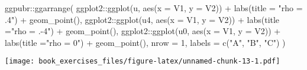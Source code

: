 \documentclass[
]{article}
\newenvironment{Shaded}{\begin{snugshade}}{\end{snugshade}}
\newcommand{\AttributeTok}[1]{\textcolor[rgb]{0.77,0.63,0.00}{#1}}
\newcommand{\DecValTok}[1]{\textcolor[rgb]{0.00,0.00,0.81}{#1}}
\newcommand{\FunctionTok}[1]{\textcolor[rgb]{0.00,0.00,0.00}{#1}}
\newcommand{\NormalTok}[1]{#1}
\newcommand{\SpecialCharTok}[1]{\textcolor[rgb]{0.00,0.00,0.00}{#1}}
\newcommand{\StringTok}[1]{\textcolor[rgb]{0.31,0.60,0.02}{#1}}
\begin{document}
\begin{Shaded}
\begin{Highlighting}[]
\NormalTok{ggpubr}\SpecialCharTok{::}\FunctionTok{ggarrange}\NormalTok{(}
\NormalTok{  ggplot2}\SpecialCharTok{::}\FunctionTok{ggplot}\NormalTok{(u, }\FunctionTok{aes}\NormalTok{(}\AttributeTok{x =}\NormalTok{ V1, }\AttributeTok{y =}\NormalTok{ V2)) }\SpecialCharTok{+}
    \FunctionTok{labs}\NormalTok{(}\AttributeTok{title =} \StringTok{"rho = .4"}\NormalTok{) }\SpecialCharTok{+} 
    \FunctionTok{geom\_point}\NormalTok{(),}
\NormalTok{  ggplot2}\SpecialCharTok{::}\FunctionTok{ggplot}\NormalTok{(u4, }\FunctionTok{aes}\NormalTok{(}\AttributeTok{x =}\NormalTok{ V1, }\AttributeTok{y =}\NormalTok{ V2)) }\SpecialCharTok{+}
    \FunctionTok{labs}\NormalTok{(}\AttributeTok{title =}\StringTok{"rho = .{-}4"}\NormalTok{) }\SpecialCharTok{+} 
    \FunctionTok{geom\_point}\NormalTok{(),}
\NormalTok{  ggplot2}\SpecialCharTok{::}\FunctionTok{ggplot}\NormalTok{(u0, }\FunctionTok{aes}\NormalTok{(}\AttributeTok{x =}\NormalTok{ V1, }\AttributeTok{y =}\NormalTok{ V2)) }\SpecialCharTok{+}
    \FunctionTok{labs}\NormalTok{(}\AttributeTok{title =}\StringTok{"rho = 0"}\NormalTok{) }\SpecialCharTok{+} 
    \FunctionTok{geom\_point}\NormalTok{(),}
  \AttributeTok{nrow =} \DecValTok{1}\NormalTok{, }\AttributeTok{labels =} \FunctionTok{c}\NormalTok{(}\StringTok{"A"}\NormalTok{, }\StringTok{"B"}\NormalTok{, }\StringTok{"C"}\NormalTok{)}
\NormalTok{)}
\end{Highlighting}
\end{Shaded}

\texttt{[image: book\_exercises\_files/figure-latex/unnamed-chunk-13-1.pdf]}
\end{document}
